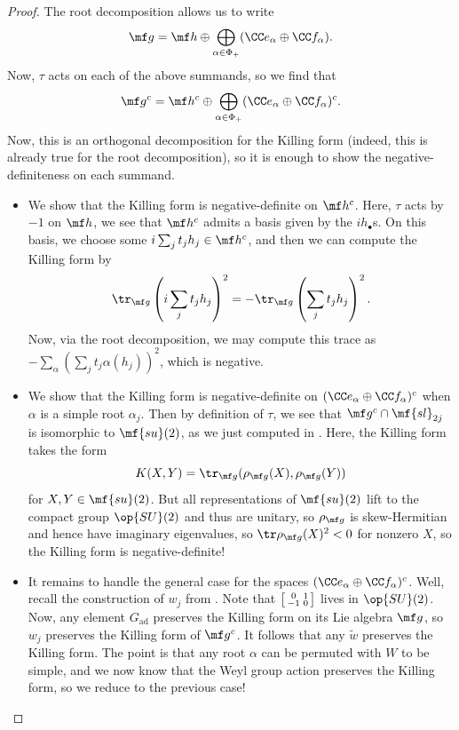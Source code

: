 \documentclass[../notes.tex]{subfiles}
\begin{document}
\begin{proof}
	The root decomposition allows us to write
	\[\mf g=\mf h\oplus\bigoplus_{\alpha\in\Phi_+}(\CC e_\alpha\oplus\CC f_\alpha).\]
	Now, $\tau$ acts on each of the above summands, so we find that
	\[\mf g^c=\mf h^c\oplus\bigoplus_{\alpha\in\Phi_+}(\CC e_\alpha\oplus\CC f_\alpha)^c.\]
	Now, this is an orthogonal decomposition for the Killing form (indeed, this is already true for the root decomposition), so it is enough to show the negative-definiteness on each summand.
	\begin{itemize}
		\item We show that the Killing form is negative-definite on $\mf h^c$. Here, $\tau$ acts by $-1$ on $\mf h$, we see that $\mf h^c$ admits a basis given by the $ih_\bullet$s. On this basis, we choose some $i\sum_jt_jh_j\in\mf h^c$, and then we can compute the Killing form by
		\[\tr_{\mf g}\left(i\sum_jt_jh_j\right)^2=-\tr_{\mf g}\left(\sum_jt_jh_j\right)^2.\]
		Now, via the root decomposition, we may compute this trace as $-\sum_\alpha\left(\sum_jt_j\alpha(h_j)\right)^2$, which is negative.

		\item We show that the Killing form is negative-definite on $(\CC e_\alpha\oplus\CC f_\alpha)^c$ when $\alpha$ is a simple root $\alpha_j$. Then by definition of $\tau$, we see that $\mf g^c\cap\mf{sl}_{2j}$ is isomorphic to $\mf{su}(2)$, as we just computed in . Here, the Killing form takes the form
		\[K(X,Y)=\tr_{\mf g}(\rho_{\mf g}(X),\rho_{\mf g}(Y))\]
		for $X,Y\in\mf{su}(2)$. But all representations of $\mf{su}(2)$ lift to the compact group $\op{SU}(2)$ and thus are unitary, so $\rho_{\mf g}$ is skew-Hermitian and hence have imaginary eigenvalues, so $\tr\rho_{\mf g}(X)^2<0$ for nonzero $X$, so the Killing form is negative-definite!
		
		\item It remains to handle the general case for the spaces $(\CC e_\alpha\oplus\CC f_\alpha)^c$. Well, recall the construction of $w_j$ from . Note that $\begin{bsmallmatrix}
			0 & 1 \\ -1 & 0
		\end{bsmallmatrix}$ lives in $\op{SU}(2)$. Now, any element $G_{\mathrm{ad}}$ preserves the Killing form on its Lie algebra $\mf g$, so $w_j$ preserves the Killing form of $\mf g^c$. It follows that any $\widetilde w$ preserves the Killing form. The point is that any root $\alpha$ can be permuted with $W$ to be simple, and we now know that the Weyl group action preserves the Killing form, so we reduce to the previous case!
		\qedhere
	\end{itemize}
\end{proof}
\end{document}
